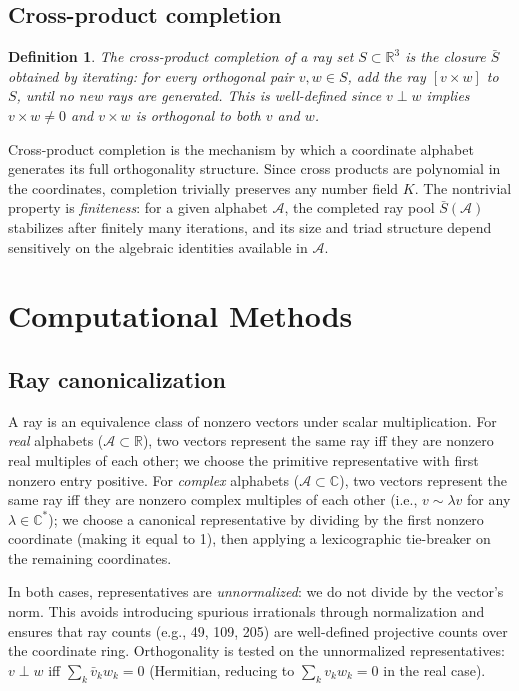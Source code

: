 \documentclass[12pt,a4paper]{article}
\newtheorem{definition}[theorem]{Definition}
\newcommand{\R}{\mathbb{R}}
\newcommand{\C}{\mathbb{C}}
\begin{document}
\subsection{Cross-product completion}

\begin{definition}\label{def:completion}
The \emph{cross-product completion} of a ray set $S \subset \R^3$ is the closure $\bar{S}$ obtained by iterating: for every orthogonal pair $v, w \in S$, add the ray $[v \times w]$ to $S$, until no new rays are generated. This is well-defined since $v \perp w$ implies $v \times w \neq 0$ and $v \times w$ is orthogonal to both $v$ and $w$.
\end{definition}

Cross-product completion is the mechanism by which a coordinate alphabet generates its full orthogonality structure. Since cross products are polynomial in the coordinates, completion trivially preserves any number field $K$. The nontrivial property is \emph{finiteness}: for a given alphabet $\mathcal{A}$, the completed ray pool $\bar{S}(\mathcal{A})$ stabilizes after finitely many iterations, and its size and triad structure depend sensitively on the algebraic identities available in $\mathcal{A}$.

\section{Computational Methods}\label{sec:methods}

\subsection{Ray canonicalization}\label{sec:canon}

A ray is an equivalence class of nonzero vectors under scalar multiplication. For \emph{real} alphabets ($\mathcal{A} \subset \R$), two vectors represent the same ray iff they are nonzero real multiples of each other; we choose the primitive representative with first nonzero entry positive. For \emph{complex} alphabets ($\mathcal{A} \subset \C$), two vectors represent the same ray iff they are nonzero complex multiples of each other (i.e., $v \sim \lambda v$ for any $\lambda \in \C^*$); we choose a canonical representative by dividing by the first nonzero coordinate (making it equal to 1), then applying a lexicographic tie-breaker on the remaining coordinates.

In both cases, representatives are \emph{unnormalized}: we do not divide by the vector's norm. This avoids introducing spurious irrationals through normalization and ensures that ray counts (e.g., 49, 109, 205) are well-defined projective counts over the coordinate ring. Orthogonality is tested on the unnormalized representatives: $v \perp w$ iff $\sum_k \bar{v}_k w_k = 0$ (Hermitian, reducing to $\sum_k v_k w_k = 0$ in the real case).
\end{document}
